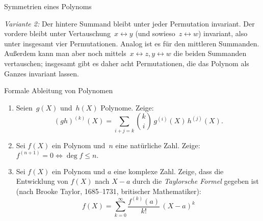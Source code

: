 \documentclass{algblatt}
\begin{document}
\begin{aufgabe}{Symmetrien eines Polynoms}
\begin{loesung}
\emph{Variante 2:} Der hintere Summand bleibt unter jeder Permutation
invariant. Der vordere bleibt unter Vertauschung~$x \leftrightarrow y$ (und
sowieso~$z \leftrightarrow w$) invariant, also unter insgesamt vier
Permutationen. Analog ist es für den mittleren Summanden. Außerdem kann man
aber noch mittels~$x \leftrightarrow z, y \leftrightarrow w$ die beiden
Summanden vertauschen; insgesamt gibt es daher acht Permutationen, die das
Polynom als Ganzes invariant lassen.
\end{loesung}
\end{aufgabe}

\begin{aufgabe}{Formale Ableitung von Polynomen}
\begin{enumerate}
\item Seien~$g(X)$ und~$h(X)$ Polynome. Zeige:
\[ (g h)^{(k)}(X)
  = \sum_{i + j = k} \binom k i \, g^{(i)}(X) \, h^{(j)}(X).
\]

\item Sei $f(X)$ ein Polynom und~$n$ eine natürliche Zahl. Zeige:
$f^{(n + 1)} = 0 \Longleftrightarrow \deg f \leq n.$

\item Sei $f(X)$ ein Polynom und $a$ eine komplexe Zahl. Zeige, dass die
Entwicklung von $f(X)$ nach $X - a$ durch die \emph{Taylorsche Formel} gegeben
ist (nach Brooke Taylor, 1685--1731, britischer Mathematiker):
\[ f(X) = \sum_{k = 0}^\infty \frac{f^{(k)}(a)}{k!} \, (X - a)^k \]
\end{enumerate}


\end{aufgabe}
\end{document}
